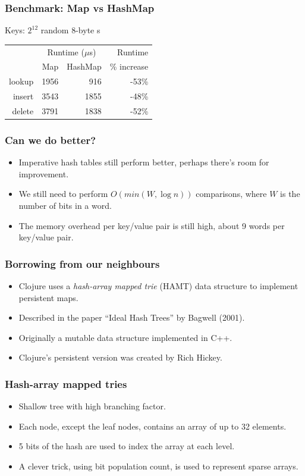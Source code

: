 \documentclass[xetex,mathserif,serif]{beamer}
\newcommand{\code}[1]{\mbox{\texttt{\small{\color{CodeColor}{#1}}}}}
\begin{document}
\begin{frame}
  \frametitle{Benchmark: Map vs HashMap}

  Keys: $2^{12}$ random 8-byte \code{ByteString}s

  \bigskip
  \begin{center}
  \begin{tabular}{r|rrr}
                  & \multicolumn{2}{c}{Runtime ($\mu$s)} & Runtime \\
                  & Map & HashMap & \% increase \\
    \hline lookup & 1956 &  916 & -53\% \\
           insert & 3543 & 1855 & -48\% \\
           delete & 3791 & 1838 & -52\% \\
  \end{tabular}
  \end{center}
\end{frame}

\begin{frame}
  \frametitle{Can we do better?}
  \begin{itemize}
  \item Imperative hash tables still perform better, perhaps there's
    room for improvement.
  \item We still need to perform $O(min(W, \log n))$ \code{Int}
    comparisons, where $W$ is the number of bits in a word.
  \item The memory overhead per key/value pair is still high, about 9
    words per key/value pair.
  \end{itemize}
\end{frame}

\begin{frame}
  \frametitle{Borrowing from our neighbours}
  \begin{itemize}
  \item Clojure uses a \emph{hash-array mapped trie} (HAMT) data
    structure to implement persistent maps.
  \item Described in the paper ``Ideal Hash Trees'' by Bagwell (2001).
  \item Originally a mutable data structure implemented in C++.
  \item Clojure's persistent version was created by Rich Hickey.
  \end{itemize}
\end{frame}

\begin{frame}
  \frametitle{Hash-array mapped tries}
  \begin{itemize}
  \item Shallow tree with high branching factor.
  \item Each node, except the leaf nodes, contains an array of up to
    32 elements.
  \item 5 bits of the hash are used to index the array at each level.
  \item A clever trick, using bit population count, is used to
    represent sparse arrays.
  \end{itemize}
\end{frame}
\end{document}
